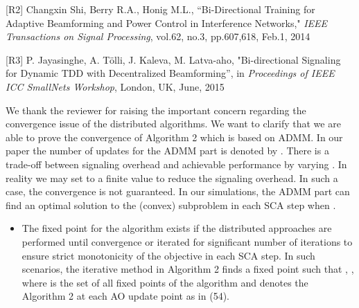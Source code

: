 \begin{enumerate}
	\vspace{1eM}
	[R2] Changxin Shi, Berry R.A., Honig M.L., ``{Bi-Directional Training for Adaptive Beamforming and Power Control in Interference Networks}," \textit{IEEE Transactions on Signal Processing}, vol.62, no.3, pp.607,618, Feb.1, 2014
	
	[R3] P. Jayasinghe, A. T\"{o}lli, J. Kaleva,  M. Latva-aho, "{Bi-directional Signaling for Dynamic TDD with Decentralized Beamforming}'', in \textit{Proceedings of IEEE ICC SmallNets Workshop}, London, UK, June, 2015		
	\vspace{1eM}
			
 

\resp We thank the reviewer for raising the important concern regarding the convergence issue of the distributed algorithms. We want to clarify that we are able to prove the convergence of Algorithm 2 which is based on \ac{ADMM}. In our paper the number of updates for the \ac{ADMM} part is denoted by . There is a trade-off between signaling overhead and achievable performance by varying . In reality we may set  to a finite value to reduce the signaling overhead. In such a case, the convergence is not guaranteed. In our simulations, the \ac{ADMM} part can find an optimal solution to the (convex) subproblem in each \ac{SCA} step when .

\begin{itemize}
\item The fixed point for the algorithm exists if the distributed approaches are performed until convergence or iterated for significant number of iterations to ensure strict monotonicity of the objective in each \ac{SCA} step. In such scenarios, the iterative method in Algorithm 2 finds a fixed point such that , , where  is the set of all fixed points of the algorithm and  denotes the Algorithm 2 at each \ac{AO} update point as in (54).


\end{itemize}
\end{enumerate}
